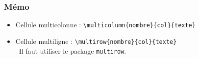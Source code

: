 \begin{frame}[containsverbatim]
    \frametitle{Mémo}
    \begin{itemize}[label=$\triangleright$]
        \item Cellule multicolonne : \verb|\multicolumn{nombre}{col}{texte}|
        \item Cellule multiligne : \verb|\multirow{nombre}{col}{texte}| \\
        \warning \, Il faut utiliser le package \texttt{multirow}.
    \end{itemize}
\end{frame}